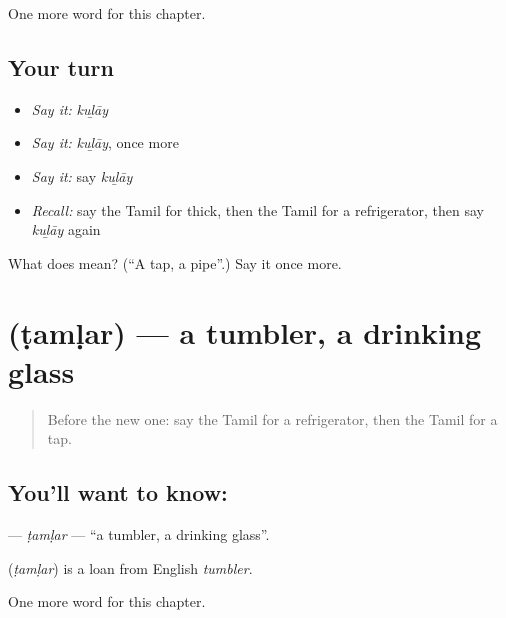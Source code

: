 \begin{grammarlens}[title={What you've built}]
One more word for this chapter.
\end{grammarlens}

\subsection*{Your turn}
\begin{itemize}
\raggedright
  \item \emph{Say it:} \emph{kuḻāy}
  \item \emph{Say it:} \emph{kuḻāy}, once more
  \item \emph{Say it:} say \emph{kuḻāy}
  \item \emph{Recall:} say the Tamil for thick, then the Tamil for a refrigerator, then say \emph{kuḻāy} again
\end{itemize}

\begin{tcolorbox}[breakable,colback=teal!4,colframe=teal!35!black,title={Before you move on}]
What does  mean? (\textquotedblleft{}A tap, a pipe\textquotedblright{}.) Say it once more.
\end{tcolorbox}
\section[\texorpdfstring{\ta{டம்ளர்} (ṭamḷar)}{டம்ளர் (ṭamḷar)}]{ (ṭamḷar) — a tumbler, a drinking glass}

\label{lesson:TA-C182-tamlar}



\begin{quote}
Before the new one: say the Tamil for a refrigerator, then the Tamil for a tap.
\end{quote}

\subsection*{You'll want to know: }
\textbf{} — \emph{ṭamḷar} — \textquotedblleft{}a tumbler, a drinking glass\textquotedblright{}.

\begin{cousinweb}
\textbf{} (\emph{ṭamḷar}) is a loan from English \emph{tumbler}.
\end{cousinweb}

\begin{grammarlens}[title={What you've built}]
One more word for this chapter.
\end{grammarlens}

